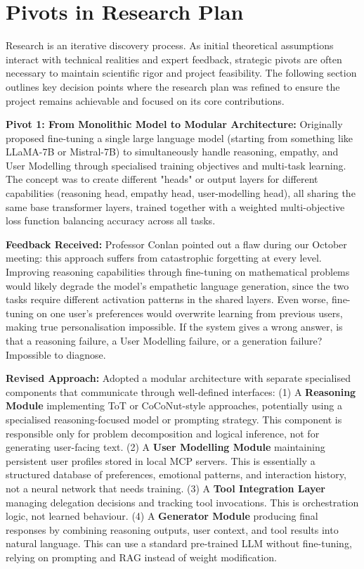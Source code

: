 \documentclass[a4paper,oneside,12pt]{book}
\numberwithin{equation}{chapter} %
\begin{document}
\section{Pivots in Research Plan}

Research is an iterative discovery process. As initial theoretical assumptions interact with technical realities and expert feedback, strategic pivots are often necessary to maintain scientific rigor and project feasibility. The following section outlines key decision points where the research plan was refined to ensure the project remains achievable and focused on its core contributions.

\textbf{Pivot 1: From Monolithic Model to Modular Architecture: } Originally proposed fine-tuning a single large language model (starting from something like LLaMA-7B or Mistral-7B) to simultaneously handle reasoning, empathy, and User Modelling through specialised training objectives and multi-task learning. The concept was to create different "heads" or output layers for different capabilities (reasoning head, empathy head, user-modelling head), all sharing the same base transformer layers, trained together with a weighted multi-objective loss function balancing accuracy across all tasks.

\textbf{Feedback Received:} Professor Conlan pointed out a flaw during our October meeting: this approach suffers from catastrophic forgetting at every level. Improving reasoning capabilities through fine-tuning on mathematical problems would likely degrade the model's empathetic language generation, since the two tasks require different activation patterns in the shared layers. Even worse, fine-tuning on one user's preferences would overwrite learning from previous users, making true personalisation impossible. If the system gives a wrong answer, is that a reasoning failure, a User Modelling failure, or a generation failure? Impossible to diagnose.

\textbf{Revised Approach:} Adopted a modular architecture with separate specialised components that communicate through well-defined interfaces: (1) A \textbf{Reasoning Module} implementing ToT or CoCoNut-style approaches, potentially using a specialised reasoning-focused model or prompting strategy. This component is responsible only for problem decomposition and logical inference, not for generating user-facing text. (2) A \textbf{User Modelling Module} maintaining persistent user profiles stored in local MCP servers. This is essentially a structured database of preferences, emotional patterns, and interaction history, not a neural network that needs training. (3) A \textbf{Tool Integration Layer} managing delegation decisions and tracking tool invocations. This is orchestration logic, not learned behaviour. (4) A \textbf{Generator Module} producing final responses by combining reasoning outputs, user context, and tool results into natural language. This can use a standard pre-trained LLM without fine-tuning, relying on prompting and RAG instead of weight modification.
\end{document}
